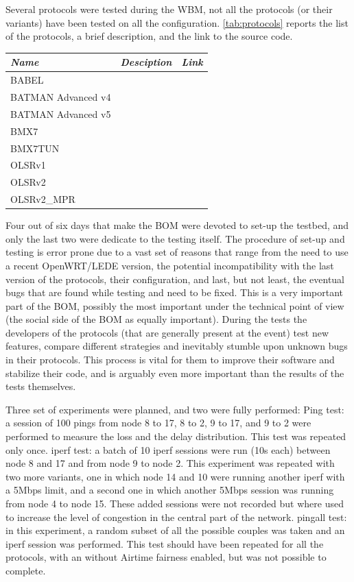 \documentclass[10pt,onecolumn]{paper}
\begin{document}
Several protocols were tested during the WBM, not all the protocols (or their
variants) have been tested on all the configuration. \cref{tab:protocols}
reports the list of the protocols, a brief description, and the link to the
source code. 

\begin{table}
    \centering
    \begin{tabular}{lll}
        \emph{Name} & \emph{Desciption} & \emph{Link} \\
        \midrule
        BABEL & & \\
        BATMAN Advanced v4 & & \\
        BATMAN Advanced v5 & & \\
        BMX7  & & \\
        BMX7TUN  & & \\
        OLSRv1 & & \\
        OLSRv2 & & \\
        OLSRv2\_MPR & & \\
        \bottomrule
    \end{tabular}
\end{table}

Four out of six days that make the BOM were devoted to set-up the testbed, and
only the last two were dedicate to the testing itself. The procedure of set-up
and testing is error prone due to a vast set of reasons that range from the need
to use a recent OpenWRT/LEDE version, the potential incompatibility with the
last version of the protocols, their configuration, and last, but not least, the
eventual bugs that are found while testing and need to be fixed. This is a very
important part of the BOM, possibly the most important under the technical
point of view (the social side of the BOM as equally important). During the
tests the developers of the protocols (that are generally present at the event)
test new features, compare different strategies and inevitably stumble upon
unknown bugs in their protocols. This process is vital for them to improve their
software and stabilize their code, and is arguably even more important than the
results of the tests themselves. 

Three set of experiments were planned, and two were fully performed:
\bi
\ii Ping test: a session of 100 pings from node 8 to 17, 8 to 2, 9 to 17, and 9
to 2 were performed to measure the loss and the delay distribution. This test
was repeated only once.
\ii iperf test: a batch of 10 iperf sessions were run (10s each) between node 8
and 17 and from node 9 to node 2. This experiment was repeated with two more
variants, one in which node 14 and 10 were running another iperf with a 5Mbps
limit, and a second one in which another 5Mbps session was running from node 4
to node 15. These added sessions were not recorded but where used to increase
the level of congestion in the central part of the network.
\ii pingall test: in this experiment, a random subset of all the possible
couples was taken and an iperf session was performed. This test should have been
repeated for all the protocols, with an without Airtime fairness enabled, but
was not possible to complete.
\ei
\end{document}
